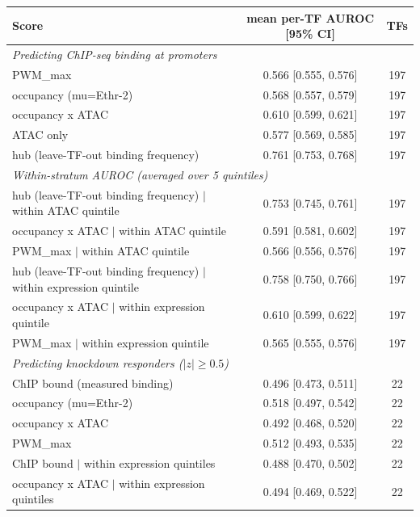 \begin{tabular}{lcc}
\toprule
Score & mean per-TF AUROC [95\% CI] & TFs \\
\midrule
\multicolumn{3}{l}{\emph{Predicting ChIP-seq binding at promoters}} \\
PWM\_max & 0.566 [0.555, 0.576] & 197 \\
occupancy (mu=Ethr-2) & 0.568 [0.557, 0.579] & 197 \\
occupancy x ATAC & 0.610 [0.599, 0.621] & 197 \\
ATAC only & 0.577 [0.569, 0.585] & 197 \\
hub (leave-TF-out binding frequency) & 0.761 [0.753, 0.768] & 197 \\
\midrule \multicolumn{3}{l}{\emph{Within-stratum AUROC (averaged over 5 quintiles)}} \\
hub (leave-TF-out binding frequency) $|$ within ATAC quintile & 0.753 [0.745, 0.761] & 197 \\
occupancy x ATAC $|$ within ATAC quintile & 0.591 [0.581, 0.602] & 197 \\
PWM\_max $|$ within ATAC quintile & 0.566 [0.556, 0.576] & 197 \\
hub (leave-TF-out binding frequency) $|$ within expression quintile & 0.758 [0.750, 0.766] & 197 \\
occupancy x ATAC $|$ within expression quintile & 0.610 [0.599, 0.622] & 197 \\
PWM\_max $|$ within expression quintile & 0.565 [0.555, 0.576] & 197 \\
\midrule \multicolumn{3}{l}{\emph{Predicting knockdown responders ($|z|\ge0.5$)}} \\
ChIP bound (measured binding) & 0.496 [0.473, 0.511] & 22 \\
occupancy (mu=Ethr-2) & 0.518 [0.497, 0.542] & 22 \\
occupancy x ATAC & 0.492 [0.468, 0.520] & 22 \\
PWM\_max & 0.512 [0.493, 0.535] & 22 \\
ChIP bound $|$ within expression quintiles & 0.488 [0.470, 0.502] & 22 \\
occupancy x ATAC $|$ within expression quintiles & 0.494 [0.469, 0.522] & 22 \\
\bottomrule
\end{tabular}